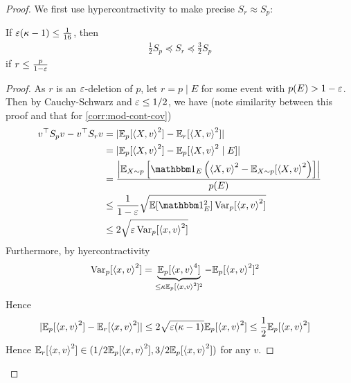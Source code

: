 \begin{proof}
  We first use hypercontractivity to make precise $S_r \approx S_p$:
  \begin{lemma}\label{lem:linreg-second-moment-close}
    If $\varepsilon (\kappa - 1) \leq \frac{1}{16}$, then
    \begin{align}
      \frac{1}{2} S_p \preceq S_r \preceq \frac{3}{2} S_p
    \end{align}
    if $r \leq \frac{p}{1-\varepsilon}$
  \end{lemma}
  \begin{proof}
    As $r$ is an $\varepsilon$-deletion of $p$,
    let $r = p \mid E$ for some event with $p(E) > 1 - \varepsilon$.
    Then by Cauchy-Schwarz and $\varepsilon \leq 1/2$, we have
    (note similarity between this proof and that for \cref{corr:mod-cont-cov})
    \begin{align}
      v^\top S_p v - v^\top S_r v
      &= \lvert \ex_p[\braket{X,v}^2] - \ex_r[\braket{X,v}^2]\rvert \\
      &= \lvert \ex_p[\braket{X,v}^2] - \ex_p[\braket{X,v}^2 \mid E]\rvert \\
      &= \frac{\left\lvert \ex_{X \sim p}\left[
      \ind_E \left(
        \braket{X, v}^2 - \ex_{X \sim p}[\braket{X, v}^2
    \right)\right] \right\rvert}{p(E)} \\
      &\leq \frac{1}{1-\eps} \sqrt{ \ex[\ind_E^2] \Var_p[\braket{x,v}^2]} \\
      &\leq 2 \sqrt{\eps \Var_p[\braket{x,v}^2]}
    \end{align}
    Furthermore, by hyercontractivity
    \begin{align}
      \operatorname{Var}_p[\braket{x,v}^2]
      &= \underbrace{\mathbb{E}_p[\braket{x,v}^4]}_{\leq \kappa \mathbb{E}_p[\braket{x,v}^2]^2}
      - \mathbb{E}_p[\braket{x,v}^2]^2
    \end{align}
    Hence
    \begin{align}
      \lvert \mathbb{E}_p[\braket{x,v}^2] - \mathbb{E}_r[\braket{x,v}^2]\rvert
      &\leq 2 \sqrt{\varepsilon (\kappa - 1)} \mathbb{E}_p[\braket{x,v}^2]
      \leq \frac{1}{2} \mathbb{E}_p[\braket{x,v}^2]
    \end{align}
    Hence $\mathbb{E}_r[\braket{x,v}^2] \in (1/2 \mathbb{E}_p[\braket{x,v}^2], 3/2
    \mathbb{E}_p[\braket{x,v}^2])$ for any $v$.
  \end{proof}


\end{proof}
